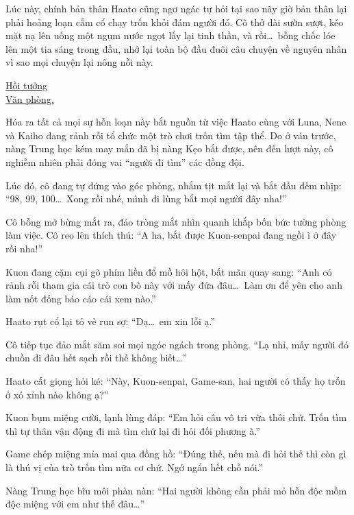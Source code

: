 \documentclass[../main.tex]{subfiles}
\begin{document}

Lúc này, chính bản thân Haato cũng ngơ ngác tự hỏi tại sao nãy giờ bản thân lại phải hoảng loạn cắm cổ chạy trốn khỏi đám người đó. Cô thở dài sườn sượt, kéo mặt nạ lên uống một ngụm nước ngọt lấy lại tinh thần, và rồi\dots\ bỗng chốc lóe lên một tia sáng trong đầu, nhớ lại toàn bộ đầu đuôi câu chuyện về nguyên nhân vì sao mọi chuyện lại nông nỗi này.

\begin{center}
    \uline{Hồi tưởng\\Văn phòng.}
\end{center}

Hóa ra tất cả mọi sự hỗn loạn này bắt nguồn từ việc Haato cùng với Luna, Nene và Kaiho đang rảnh rỗi tổ chức một trò chơi trốn tìm tập thể. Do ở ván trước, nàng Trung học kém may mắn đã bị nàng Kẹo bắt được, nên đến lượt này, cô nghiễm nhiên phải đóng vai ``người đi tìm'' các đồng đội.


Lúc đó, cô đang tự đứng vào góc phòng, nhắm tịt mắt lại và bắt đầu đếm nhịp: ``98, 99, 100\dots\ Xong rồi nhé, mình đi lùng bắt mọi người đây nha!''

Cô bỗng mở bừng mắt ra, đảo tròng mắt nhìn quanh khắp bốn bức tường phòng làm việc. Cô reo lên thích thú: ``A ha, bắt được Kuon-senpai đang ngồi ì ở đây rồi nha!''

Kuon đang cặm cụi gõ phím liền đổ mồ hôi hột, bất mãn quay sang: ``Anh có rảnh rỗi tham gia cái trò con bò này với mấy đứa đâu\dots\ Làm ơn để yên cho anh làm nốt đống báo cáo cái xem nào.''

Haato rụt cổ lại tỏ vẻ run sợ: ``Dạ\dots\ em xin lỗi ạ.''

Cô tiếp tục đảo mắt săm soi mọi ngóc ngách trong phòng. ``Lạ nhỉ, mấy người đó chuồn đi đâu hết sạch rồi thế không biết\dots''

Haato cất giọng hỏi ké: ``Này, Kuon-senpai, Game-san, hai người có thấy họ trốn ở xó xỉnh nào không ạ?''

Kuon bụm miệng cười, lạnh lùng đáp: ``Em hỏi câu vô tri vừa thôi chứ. Trốn tìm thì tự thân vận động đi mà tìm chứ lại đi hỏi đối phương à.''

Game chép miệng mỉa mai qua đồng hồ: ``Đúng thế, nếu mà đi hỏi thế thì còn gì là thú vị của trò trốn tìm nữa cơ chứ. Ngớ ngẩn hết chỗ nói.''

Nàng Trung học bĩu môi phàn nàn: ``Hai người không cần phải mỏ hỗn độc mồm độc miệng với em như thế đâu\dots''
\end{document}
